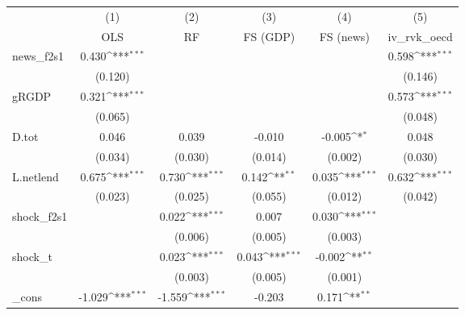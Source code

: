 {
\def\sym#1{\ifmmode^{#1}\else\(^{#1}\)\fi}
\begin{tabular}{l*{5}{c}}
\toprule
            &\multicolumn{1}{c}{(1)}&\multicolumn{1}{c}{(2)}&\multicolumn{1}{c}{(3)}&\multicolumn{1}{c}{(4)}&\multicolumn{1}{c}{(5)}\\
            &\multicolumn{1}{c}{OLS}&\multicolumn{1}{c}{RF}&\multicolumn{1}{c}{FS (GDP)}&\multicolumn{1}{c}{FS (news)}&\multicolumn{1}{c}{iv\_rvk\_oecd}\\
\midrule
news\_f2s1   &       0.430\sym{***}&                     &                     &                     &       0.598\sym{***}\\
            &     (0.120)         &                     &                     &                     &     (0.146)         \\
\addlinespace
gRGDP       &       0.321\sym{***}&                     &                     &                     &       0.573\sym{***}\\
            &     (0.065)         &                     &                     &                     &     (0.048)         \\
\addlinespace
D.tot       &       0.046         &       0.039         &      -0.010         &      -0.005\sym{*}  &       0.048         \\
            &     (0.034)         &     (0.030)         &     (0.014)         &     (0.002)         &     (0.030)         \\
\addlinespace
L.netlend   &       0.675\sym{***}&       0.730\sym{***}&       0.142\sym{**} &       0.035\sym{***}&       0.632\sym{***}\\
            &     (0.023)         &     (0.025)         &     (0.055)         &     (0.012)         &     (0.042)         \\
\addlinespace
shock\_f2s1  &                     &       0.022\sym{***}&       0.007         &       0.030\sym{***}&                     \\
            &                     &     (0.006)         &     (0.005)         &     (0.003)         &                     \\
\addlinespace
shock\_t     &                     &       0.023\sym{***}&       0.043\sym{***}&      -0.002\sym{**} &                     \\
            &                     &     (0.003)         &     (0.005)         &     (0.001)         &                     \\
\addlinespace
\_cons      &      -1.029\sym{***}&      -1.559\sym{***}&      -0.203         &       0.171\sym{**} &                     \\

\end{tabular}}

